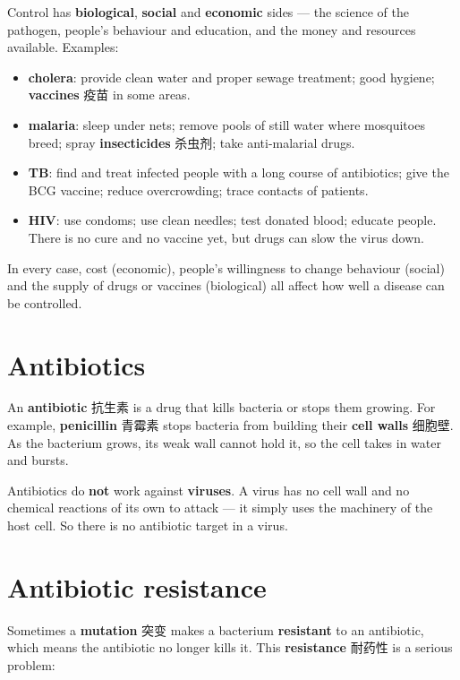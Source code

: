 \documentclass[11pt]{article}
\begin{document}
Control has \textbf{biological}, \textbf{social} and \textbf{economic} sides — the science of the pathogen, people's behaviour and education, and the money and resources available. Examples:

\begin{itemize}
\item \textbf{cholera}: provide clean water and proper sewage treatment; good hygiene; \textbf{vaccines} 疫苗 in some areas.

\item \textbf{malaria}: sleep under nets; remove pools of still water where mosquitoes breed; spray \textbf{insecticides} 杀虫剂; take anti-malarial drugs.

\item \textbf{TB}: find and treat infected people with a long course of antibiotics; give the BCG vaccine; reduce overcrowding; trace contacts of patients.

\item \textbf{HIV}: use condoms; use clean needles; test donated blood; educate people. There is no cure and no vaccine yet, but drugs can slow the virus down.

\end{itemize}

In every case, cost (economic), people's willingness to change behaviour (social) and the supply of drugs or vaccines (biological) all affect how well a disease can be controlled.

\section*{Antibiotics}

An \textbf{antibiotic} 抗生素 is a drug that kills bacteria or stops them growing. For example, \textbf{penicillin} 青霉素 stops bacteria from building their \textbf{cell walls} 细胞壁. As the bacterium grows, its weak wall cannot hold it, so the cell takes in water and bursts.

Antibiotics do \textbf{not} work against \textbf{viruses}. A virus has no cell wall and no chemical reactions of its own to attack — it simply uses the machinery of the host cell. So there is no antibiotic target in a virus.

\section*{Antibiotic resistance}

Sometimes a \textbf{mutation} 突变 makes a bacterium \textbf{resistant} to an antibiotic, which means the antibiotic no longer kills it. This \textbf{resistance} 耐药性 is a serious problem:
\end{document}
